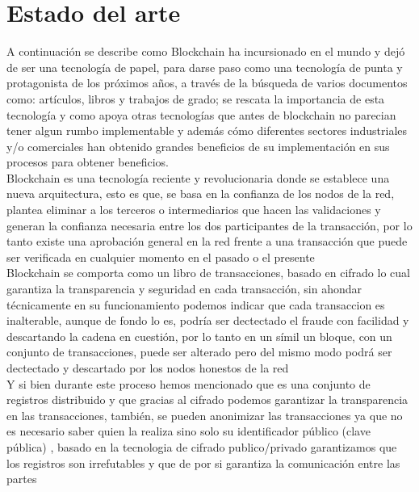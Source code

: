 \section{Estado del arte}

A continuación se describe como Blockchain ha incursionado en el mundo y dejó de ser una tecnología de papel, para darse paso como una tecnología de punta y protagonista de los próximos años, a través de la búsqueda de varios documentos como: artículos, libros y trabajos de grado; se rescata la importancia de esta tecnología y como apoya otras tecnologías que antes de blockchain no parecian tener algun rumbo implementable y además cómo diferentes sectores industriales y/o comerciales han obtenido grandes beneficios de su implementación en sus procesos para obtener beneficios.
\\
Blockchain es una tecnología reciente y revolucionaria donde se establece una nueva arquitectura\citep{iansiti2017truth}, esto es que, se basa en la confianza de los nodos de la red, plantea eliminar a los terceros o intermediarios que hacen las validaciones y generan la confianza necesaria entre los dos participantes de la transacción, por lo tanto existe una aprobación general en la red frente a una transacción  que puede ser verificada en cualquier momento en el pasado o el presente \citep{crosby2016blockchain}
\\
Blockchain se comporta como un libro de transacciones, basado en cifrado lo cual garantiza la transparencia y seguridad en cada transacción, sin ahondar técnicamente en su funcionamiento podemos indicar que cada transaccion es inalterable, aunque de fondo lo es, podría ser dectectado el fraude con facilidad y descartando la cadena en cuestión, por lo tanto en un símil un bloque, con un conjunto de transacciones, puede ser alterado pero del mismo modo podrá ser dectectado y descartado por los nodos honestos de la red \citep{nakamoto2009bitcoin}
\\
Y si bien durante este proceso hemos mencionado que es una conjunto de registros distribuido y que gracias al cifrado podemos garantizar la transparencia en las transacciones, también, se pueden anonimizar las transacciones ya que no es necesario saber quien la realiza sino solo su identificador público (clave pública) \citep{crosby2016blockchain}, basado en la tecnologia de cifrado publico/privado garantizamos que los registros son irrefutables \citep{banafa2017Blockchain} y que de por si garantiza la comunicación entre las partes \citep{iansiti2017truth}


